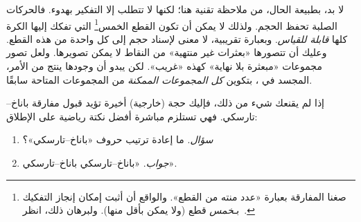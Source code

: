 \documentclass[../../../include/open-logic-section]{subfiles}
\begin{document}
لا بد، بطبيعة الحال، من ملاحظة تقنية هنا؛ لكنها لا تتطلب إلا التفكير
بهدوء. فالحركات الصلبة تحفظ الحجم. ولذلك لا يمكن أن تكون القطع
الخمس\footnote{صغنا المفارقة بعبارة «عدد منته من القطع». والواقع أن
\citet{Robinson1947} أثبت إمكان إنجاز التفكيك بـ\emph{خمس} قطع (ولا
يمكن بأقل منها). ولبرهان ذلك، انظر~\citet[pp.~66--7]{Wagon2016}.}
التي تفكك إليها الكرة كلها \emph{قابلة للقياس}. وبعبارة تقريبية، لا
معنى لإسناد حجم إلى كل واحدة من هذه القطع. وعليك أن تتصورها «بعثرات
غير منتهية» من النقاط لا يمكن تصويرها. ولعل تصور مجموعات «مبعثرة بلا
نهاية» كهذه «غريب». لكن يبدو أن وجودها ينتج من الأمر، المجسد في
\stagesacc{}، بتكوين \emph{كل المجموعات الممكنة} من المجموعات
المتاحة سابقًا.

إذا لم يقنعك شيء من ذلك، فإليك حجة (خارجية) أخيرة تؤيد قبول مفارقة
باناخ--تارسكي. فهي تستلزم مباشرة أفضل نكتة رياضية على الإطلاق:
\begin{enumerate}
	\item[] \emph{سؤال}. ما إعادة ترتيب حروف «باناخ--تارسكي»؟
	\item[] \emph{جواب}. «باناخ--تارسكي باناخ--تارسكي».
\end{enumerate}
\end{document}
